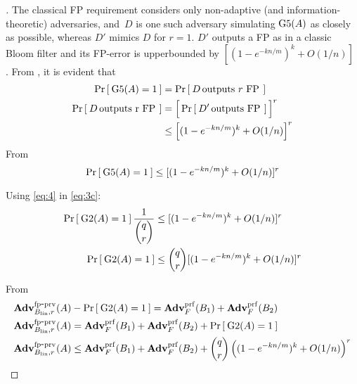 \begin{proof}[]
The classical FP requirement considers only non-adaptive (and information-theoretic) adversaries, and~$D$ is one such adversary simulating $\text{G5}(A)$ as closely as possible, whereas $D'$ mimics $D$ for $r=1$. $D'$ outputs a FP as in a classic Bloom filter and its FP-error is upperbounded by $[(1-e^{-kn/m})^k +O(1/n)]$ \cite{KirschMitzenmacher}.  %
\noindent
From , it is evident that 
\begin{align}
\Pr\left[\: \text{G5}(A)=1 \:\right] &= \Pr\left[\: D \, \mbox{outputs $r$ FP} \, \:\right]\label{eq:4a}\\
\nonumber \Pr\left[\: D \, \mbox{outputs r FP} \, \:\right] &=  \Big[\Pr\left[\: D' \, \mbox{outputs FP} \, \:\right]\Big]^r\\
& \leq \Big[(1-e^{-kn/m})^k +O(1/n)\Big]^r \label{eq:4b}
\end{align}
\noindent
From 
\begin{equation}
\Pr\left[\: \text{G5}(A)=1 \:\right] \leq [(1-e^{-kn/m})^k + O(1/n)]^r \label{eq:4}
\end{equation}

\noindent
Using \ref{eq:4} in \ref{eq:3c}:
\begin{align}
\nonumber \Pr\left[\: \text{G2}(A)=1 \:\right]\frac{1}{\dbinom{q}{r}}  &\leq [(1-e^{-kn/m})^k +O(1/n)]^r\\
 \Pr\left[\: \text{G2}(A)=1 \:\right]  & \leq \dbinom{q}{r}[(1-e^{-kn/m})^k +O(1/n)]^r\label{eq:5}
\end{align}

\noindent

From  \\
\begin{align}
\nonumber \mathrm{\mathbf{Adv}}^{\mathrm{fp\mbox{-}prv}}_{B_{\mathrm{lin}},r}(A) &- \Pr\left[\: \text{G2}(A)=1 \:\right] =  \mathbf{Adv}^{\mathrm{prf}}_{F}(B_1) + \mathbf{Adv}^{\mathrm{prf}}_{F}(B_2)   \\
\nonumber \mathrm{\mathbf{Adv}}^{\mathrm{fp\mbox{-}prv}}_{B_{\mathrm{lin}},r}(A)  &=  \mathbf{Adv}^{\mathrm{prf}}_{F}(B_1) + \mathbf{Adv}^{\mathrm{prf}}_{F}(B_2) + \Pr\left[\: \text{G2}(A)=1 \:\right]  \\
\mathrm{\mathbf{Adv}}^{\mathrm{fp\mbox{-}prv}}_{B_{\mathrm{lin}},r}(A) &\leq  \mathbf{Adv}^{\mathrm{prf}}_{F}(B_1) +
\mathbf{Adv}^{\mathrm{prf}}_{F}(B_2)  +{\dbinom{q}{r}} \left( (1-e^{-kn/m})^k + O(1/n) \right)^r
\end{align}

\end{proof}

